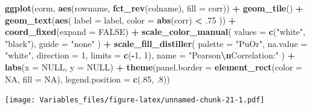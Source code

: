 \documentclass[
]{article}
\newenvironment{Shaded}{\begin{snugshade}}{\end{snugshade}}
\newcommand{\AttributeTok}[1]{\textcolor[rgb]{0.13,0.29,0.53}{#1}}
\newcommand{\ConstantTok}[1]{\textcolor[rgb]{0.56,0.35,0.01}{#1}}
\newcommand{\DecValTok}[1]{\textcolor[rgb]{0.00,0.00,0.81}{#1}}
\newcommand{\FunctionTok}[1]{\textcolor[rgb]{0.13,0.29,0.53}{\textbf{#1}}}
\newcommand{\NormalTok}[1]{#1}
\newcommand{\SpecialCharTok}[1]{\textcolor[rgb]{0.81,0.36,0.00}{\textbf{#1}}}
\newcommand{\StringTok}[1]{\textcolor[rgb]{0.31,0.60,0.02}{#1}}
\begin{document}
\begin{Shaded}
\begin{Highlighting}[]
\FunctionTok{ggplot}\NormalTok{(corm, }\FunctionTok{aes}\NormalTok{(rowname, }\FunctionTok{fct\_rev}\NormalTok{(colname),}
                 \AttributeTok{fill =}\NormalTok{ corr)) }\SpecialCharTok{+}
  \FunctionTok{geom\_tile}\NormalTok{() }\SpecialCharTok{+}
  \FunctionTok{geom\_text}\NormalTok{(}\FunctionTok{aes}\NormalTok{(}
    \AttributeTok{label =}\NormalTok{ label,}
    \AttributeTok{color =} \FunctionTok{abs}\NormalTok{(corr) }\SpecialCharTok{\textless{}}\NormalTok{ .}\DecValTok{75}
\NormalTok{  )) }\SpecialCharTok{+}
  \FunctionTok{coord\_fixed}\NormalTok{(}\AttributeTok{expand =} \ConstantTok{FALSE}\NormalTok{) }\SpecialCharTok{+}
  \FunctionTok{scale\_color\_manual}\NormalTok{(}
    \AttributeTok{values =} \FunctionTok{c}\NormalTok{(}\StringTok{"white"}\NormalTok{, }\StringTok{"black"}\NormalTok{),}
    \AttributeTok{guide =} \StringTok{"none"}
\NormalTok{  ) }\SpecialCharTok{+}
  \FunctionTok{scale\_fill\_distiller}\NormalTok{(}
    \AttributeTok{palette =} \StringTok{"PuOr"}\NormalTok{, }\AttributeTok{na.value =} \StringTok{"white"}\NormalTok{,}
    \AttributeTok{direction =} \DecValTok{1}\NormalTok{, }\AttributeTok{limits =} \FunctionTok{c}\NormalTok{(}\SpecialCharTok{{-}}\DecValTok{1}\NormalTok{, }\DecValTok{1}\NormalTok{),}
    \AttributeTok{name =} \StringTok{"Pearson}\SpecialCharTok{\textbackslash{}n}\StringTok{Correlation:"}
\NormalTok{  ) }\SpecialCharTok{+}
  \FunctionTok{labs}\NormalTok{(}\AttributeTok{x =} \ConstantTok{NULL}\NormalTok{, }\AttributeTok{y =} \ConstantTok{NULL}\NormalTok{) }\SpecialCharTok{+}
  \FunctionTok{theme}\NormalTok{(}\AttributeTok{panel.border =} \FunctionTok{element\_rect}\NormalTok{(}\AttributeTok{color =} \ConstantTok{NA}\NormalTok{, }\AttributeTok{fill =} \ConstantTok{NA}\NormalTok{),}
        \AttributeTok{legend.position =} \FunctionTok{c}\NormalTok{(.}\DecValTok{85}\NormalTok{, .}\DecValTok{8}\NormalTok{))}
\end{Highlighting}
\end{Shaded}

\texttt{[image: Variables\_files/figure-latex/unnamed-chunk-21-1.pdf]}
\end{document}
